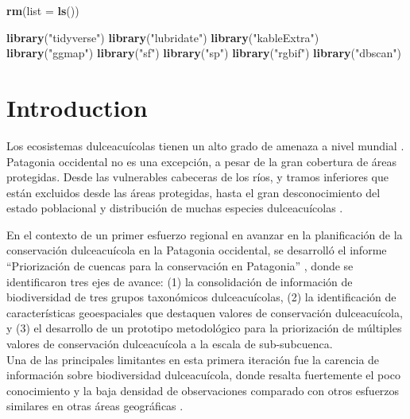 \documentclass[sn-apa,pdflatex]{sn-jnl}
\newenvironment{Shaded}{\begin{snugshade}}{\end{snugshade}}
\newcommand{\AttributeTok}[1]{\textcolor[rgb]{0.13,0.29,0.53}{#1}}
\newcommand{\FunctionTok}[1]{\textcolor[rgb]{0.13,0.29,0.53}{\textbf{#1}}}
\newcommand{\NormalTok}[1]{#1}
\newcommand{\StringTok}[1]{\textcolor[rgb]{0.31,0.60,0.02}{#1}}
\begin{document}
\begin{Shaded}
\begin{Highlighting}[]
\FunctionTok{rm}\NormalTok{(}\AttributeTok{list =} \FunctionTok{ls}\NormalTok{())}
\end{Highlighting}
\end{Shaded}

\begin{Shaded}
\begin{Highlighting}[]
\FunctionTok{library}\NormalTok{(}\StringTok{"tidyverse"}\NormalTok{)}
\FunctionTok{library}\NormalTok{(}\StringTok{"lubridate"}\NormalTok{)}
\FunctionTok{library}\NormalTok{(}\StringTok{"kableExtra"}\NormalTok{)}
\FunctionTok{library}\NormalTok{(}\StringTok{"ggmap"}\NormalTok{)}
\FunctionTok{library}\NormalTok{(}\StringTok{"sf"}\NormalTok{)}
\FunctionTok{library}\NormalTok{(}\StringTok{"sp"}\NormalTok{)}
\FunctionTok{library}\NormalTok{(}\StringTok{"rgbif"}\NormalTok{)}
\FunctionTok{library}\NormalTok{(}\StringTok{"dbscan"}\NormalTok{)}
\end{Highlighting}
\end{Shaded}

\section{Introduction}\label{sec1}

Los ecosistemas dulceacuícolas tienen un alto grado de amenaza a nivel
mundial \citep{Dudgeon2006}. Patagonia occidental no es una excepción, a
pesar de la gran cobertura de áreas protegidas. Desde las vulnerables
cabeceras de los ríos, y tramos inferiores que están excluidos desde las
áreas protegidas, hasta el gran desconocimiento del estado poblacional y
distribución de muchas especies dulceacuícolas \citep{Reid2021}.

En el contexto de un primer esfuerzo regional en avanzar en la
planificación de la conservación dulceacuícola en la Patagonia
occidental, se desarrolló el informe ``Priorización de cuencas para la
conservación en Patagonia'' \citep{Aguilar2022}, donde se identificaron
tres ejes de avance: (1) la consolidación de información de
biodiversidad de tres grupos taxonómicos dulceacuícolas, (2) la
identificación de características geoespaciales que destaquen valores de
conservación dulceacuícola, y (3) el desarrollo de un prototipo
metodológico para la priorización de múltiples valores de conservación
dulceacuícola a la escala de sub-subcuenca.\\
Una de las principales limitantes en esta primera iteración fue la
carencia de información sobre biodiversidad dulceacuícola, donde resalta
fuertemente el poco conocimiento y la baja densidad de observaciones
comparado con otros esfuerzos similares en otras áreas geográficas
\citep[p.~26]{Aguilar2022}.
\end{document}
